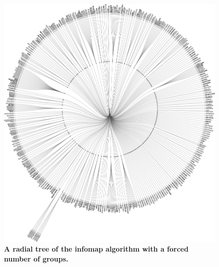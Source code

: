  \begin{figure}[H]
    \centering
    \includegraphics[width=\textwidth]{fig/manygroups.pdf}
    \caption{\textbf{A radial tree of the infomap algorithm with a forced number of groups.} }
        \label{fig:im200}
  \end{figure}




















%

